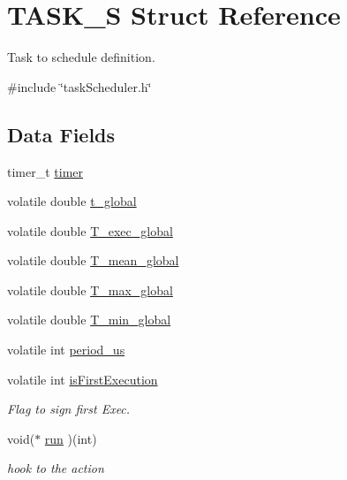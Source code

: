 \hypertarget{structTASK__S}{
\section{TASK\_\-S Struct Reference}
\label{structTASK__S}
}


Task to schedule definition.  




{\ttfamily \#include \char`\"{}taskScheduler.h\char`\"{}}

\subsection*{Data Fields}
\begin{DoxyCompactItemize}
\item 
timer\_\-t \hyperlink{structTASK__S_a17834f3d4f84241ccb4191f3cf7d7af3}{timer}
\item 
volatile double \hyperlink{structTASK__S_a29a175bdd4b9f880a2b69bb5186e3c7e}{t\_\-global}
\item 
volatile double \hyperlink{structTASK__S_ae06b712fd9963cff8192e9ef3140bc6d}{T\_\-exec\_\-global}
\item 
volatile double \hyperlink{structTASK__S_a9ebae87e1b64869f328a47473f2ea7d7}{T\_\-mean\_\-global}
\item 
volatile double \hyperlink{structTASK__S_a430c874cbf361b6dbc75ad1540880948}{T\_\-max\_\-global}
\item 
volatile double \hyperlink{structTASK__S_a07174e333a0013f4d51b30509b388f58}{T\_\-min\_\-global}
\item 
volatile int \hyperlink{structTASK__S_aabd8f80831e6cfd8e51bbd371eed907b}{period\_\-us}
\item 
volatile int \hyperlink{structTASK__S_a4b50404ee955691f1c62845cdc9de676}{isFirstExecution}
\begin{DoxyCompactList}\small\item\em Flag to sign first Exec. \item\end{DoxyCompactList}\item 
void($\ast$ \hyperlink{structTASK__S_a6ce7396d04fd08be26e2e8b75a276122}{run} )(int)
\begin{DoxyCompactList}\small\item\em hook to the action \item\end{DoxyCompactList}\end{DoxyCompactItemize}


